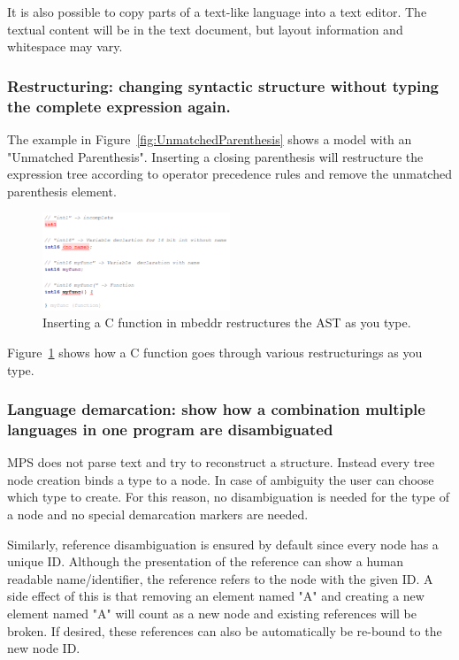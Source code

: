 \documentclass[preprint,numbers,10pt]{sigplanconf}
\begin{document}
It is also possible to copy parts of a text-like language into a text editor. The textual content will be in the text document, but layout information and whitespace may vary.

\subsubsection{Restructuring: changing syntactic structure without typing the complete expression again.}
The example in Figure~\ref{fig:UnmatchedParenthesis} shows a model with an "Unmatched Parenthesis". Inserting a closing parenthesis will restructure the expression tree according to operator precedence rules and remove the unmatched parenthesis element.

\begin{figure}[H]
	\centering
	\includegraphics[width=0.5\textwidth]{screens/TypeAndRestructure.png}
	\caption{Inserting a C function in mbeddr restructures the AST as you type.}
	\label{fig:TypeAndRestructure}
\end{figure}
Figure~\ref{fig:TypeAndRestructure} shows how a C function goes through various restructurings as you type.

\subsubsection{Language demarcation: show how a combination multiple languages in one program are disambiguated}
MPS does not parse text and try to reconstruct a structure. Instead every tree node creation binds a type to a node. In case of ambiguity the user can choose which type to create. For this reason, no disambiguation is needed for the type of a node and no special demarcation markers are needed.

Similarly, reference disambiguation is ensured by default since every node has a unique ID. Although the presentation of the reference can show a human readable name/identifier, the reference refers to the node with the given ID. A side effect of this is that removing an element named "A" and creating a new element named "A" will count as a new node and existing references will be broken. If desired, these references can also be automatically be re-bound to the new node ID.
\end{document}
